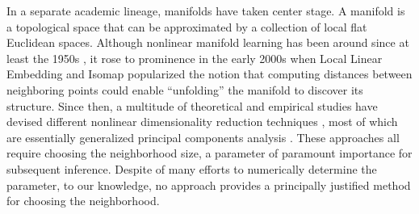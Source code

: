 \documentclass[11pt]{article}
\newcommand{\note}[2][]{\added[#1,remark={#2}]{}}
\newcommand{\jovo}[1]{{\note{jv: #1}}}
\newcommand{\cs}[1]{{\note{cs: #1}}}
\begin{document}
In a separate academic lineage, manifolds have taken center stage.  A manifold is a topological space that can be approximated by a collection of local flat Euclidean spaces.  Although nonlinear manifold learning has been around since at least the 1950s \cite{TorgersonBook}, it rose to prominence in the early 2000s when Local Linear Embedding \cite{SaulRoweis2000} and Isomap \cite{TenenbaumSilvaLangford2000} popularized the notion that computing distances between neighboring points could enable ``unfolding'' the manifold to discover its structure.  Since then, a multitude of theoretical and empirical studies have devised different nonlinear dimensionality reduction techniques \cite{LeeVerleysen2007}, most of which are essentially generalized principal components analysis \cite{ScholkopfSmolaMuller1999}.  These approaches all require choosing the neighborhood size, a parameter of paramount importance for subsequent inference. Despite of many efforts to numerically determine the parameter, to our knowledge, no approach provides a principally justified method for choosing the neighborhood. 
\end{document}
